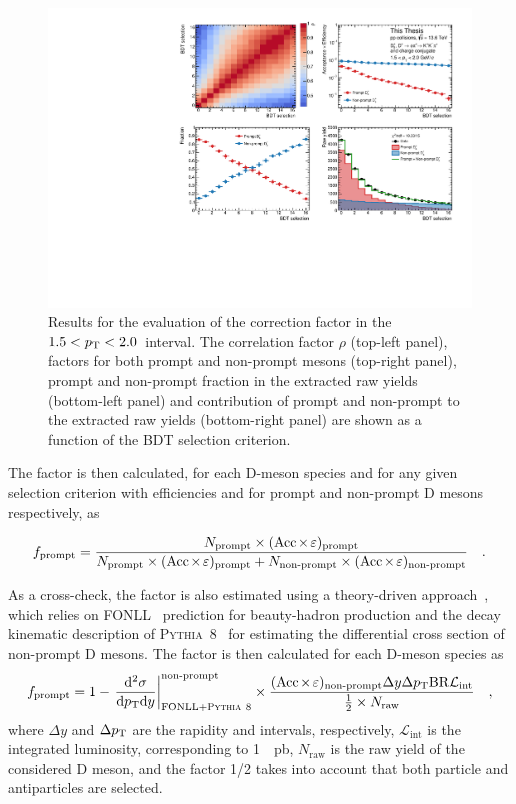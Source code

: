 \begin{sloppypar}
\begin{figure}[htb]
    \begin{center}
    \includegraphics[width=\textwidth]{Figures/Chapter 6/DsPromptFrac.pdf}
    \caption{Results for the evaluation of the \ds \fp correction factor in the $1.5<p_\mathrm{T}<2.0$~\gevc interval. The correlation factor $\rho$ (top-left panel), \aeff factors for both prompt and non-prompt \ds mesons (top-right panel), prompt and non-prompt fraction in the extracted \ds raw yields (bottom-left panel) and contribution of prompt and non-prompt to the extracted raw yields (bottom-right panel) are shown as a function of the BDT selection criterion.} 
    \label{fig:fp} 
    \end{center}
\end{figure}

The \fp factor is then calculated, for each D-meson species and for any given selection criterion with efficiencies \aeffp and \aeffnp for prompt and non-prompt D mesons respectively, as
\end{sloppypar}
\begin{equation*}
    f_\mathrm{prompt} = \frac{N_\mathrm{prompt}\times(\mathrm{Acc}\mkern-2mu\times\mkern-2mu\varepsilon)_\mathrm{prompt}}{N_\mathrm{prompt}\times(\mathrm{Acc}\mkern-2mu\times\mkern-2mu\varepsilon)_\mathrm{prompt} + N_\mathrm{non\text{-}prompt}\times(\mathrm{Acc}\mkern-2mu\times\mkern-2mu\varepsilon)_\mathrm{non\text{-}prompt}}\quad .
\end{equation*}

As a cross-check, the \fp factor is also estimated using a theory-driven approach~\cite{ALICE:2017olh}, which relies on FONLL~\cite{Cacciari:1998it} prediction for beauty-hadron production and the decay kinematic description of \textsc{Pythia~8}~\cite{Bierlich:2022pfr} for estimating the \pt differential cross section of non-prompt D mesons. The \fp factor is then calculated for each D-meson species as 
\begin{equation*}
    f_\mathrm{prompt} = 1-\left.\frac{\mathrm{d}^2\sigma}{\mathrm{d}p_\mathrm{T}\mathrm{d} y}\right\vert_\mathrm{FONLL+\textsc{Pythia}~8}^\mathrm{non\text{-}prompt}\times\frac{(\mathrm{Acc}\mkern-2mu\times\mkern-2mu\varepsilon)_\mathrm{non\text{-}prompt} \Delta y \Delta p_\mathrm{T} \mathrm{BR} \mathcal{L}_\mathrm{int}}{\frac{1}{2}\times N_\mathrm{raw} }\quad ,
\end{equation*}
where $\Delta y$ and $\Delta p_\mathrm{T}$ are the rapidity and \pt intervals, respectively, $\mathcal{L}_\mathrm{int}$ is the integrated luminosity, corresponding to \SI{1}{\per\pico\barn}, $N_\mathrm{raw}$ is the raw yield of the considered D meson, and the factor 1/2 takes into account that both particle and antiparticles are selected. 

